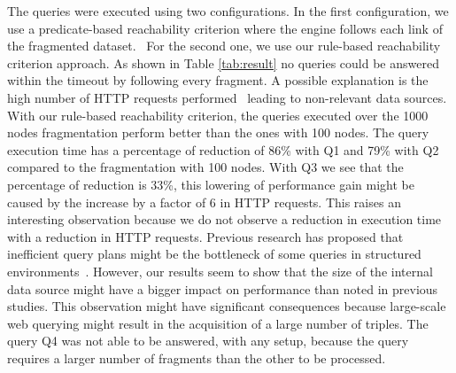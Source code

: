 The queries were executed using two configurations.
In the first configuration, we use a predicate-based reachability criterion where the engine follows each link of the fragmented dataset.~
For the second one, we use our rule-based reachability criterion approach.
As shown in Table \ref{tab:result} no queries could be answered within the timeout by following every fragment.
A possible explanation is the high number of HTTP requests performed~\cite{Hartig2016} leading to non-relevant data sources. 
With our rule-based reachability criterion, the queries executed over the 1000 nodes fragmentation perform better than the ones with 100 nodes.
The query execution time has a percentage of reduction of 86\% with Q1 and 79\% with Q2 compared to the fragmentation with 100 nodes.
With Q3 we see that the percentage of reduction is 33\%, this lowering of performance gain might be caused by the increase by a factor of 6 in HTTP requests.
This raises an interesting observation because we do not observe a reduction in execution time with a reduction in HTTP requests.
Previous research has proposed that inefficient query plans might be the bottleneck of some queries in structured environments~\cite{taelman2023,eschauzier_quweda_2023}.
However, our results seem to show that the size of the internal data source might have a bigger impact on performance than noted in previous studies.
This observation might have significant consequences because large-scale web querying might result in the acquisition of a large number of triples.
The query Q4 was not able to be answered, with any setup, because the query requires a larger number of fragments than the other to be processed.